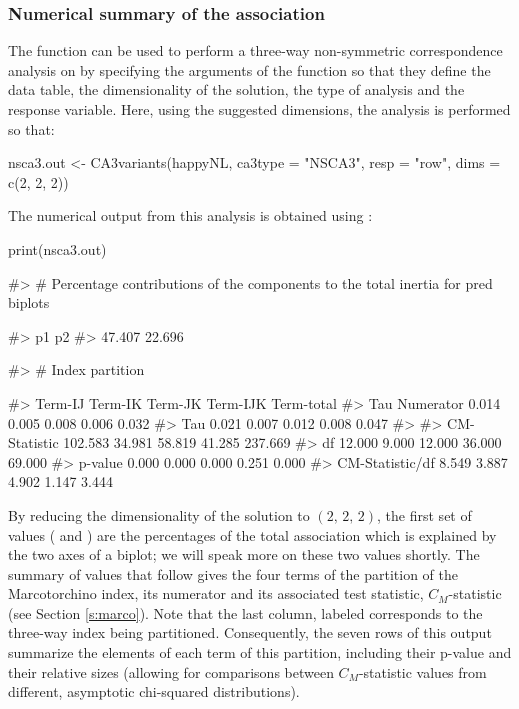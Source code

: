 \subsubsection{Numerical summary of the association}
The  function can be used to perform a three-way non-symmetric correspondence analysis on  by specifying the arguments of the function so that they define the data table, the dimensionality of the solution, the type of analysis and the response variable. Here, using the suggested dimensions, the analysis is performed so that: 
\begin{example}
 nsca3.out <- CA3variants(happyNL, ca3type = "NSCA3", resp = "row", 
 dims = c(2, 2, 2))
\end{example}
The numerical output from this analysis is obtained using : 
\begin{example}
 print(nsca3.out)

#> # Percentage contributions of the components to the total inertia for pred biplots

#>   p1     p2 
#> 47.407 22.696 

#> #  Index partition

#>                Term-IJ Term-IK Term-JK Term-IJK Term-total
#> Tau Numerator     0.014   0.005   0.008    0.006      0.032
#> Tau               0.021   0.007   0.012    0.008      0.047
#> %
#> CM-Statistic    102.583  34.981  58.819   41.285    237.669
#> df               12.000   9.000  12.000   36.000     69.000
#> p-value           0.000   0.000   0.000    0.251      0.000
#> CM-Statistic/df   8.549   3.887   4.902    1.147      3.444
\end{example}

By reducing the dimensionality of the solution to $\left(2, \, 2, \, 2\right)$, the first set of values ( and ) are the percentages of the total association which is explained by the two axes of a biplot; we will speak more on these two values shortly. The summary of values that follow  gives the four terms of the partition of the Marcotorchino index, its numerator and its associated test statistic, $C_M$-statistic (see Section \ref{s:marco}). Note that the last column, labeled  corresponds to the three-way index  being partitioned. Consequently, the seven rows of this output summarize the elements of each term of this partition, including their p-value and their relative sizes (allowing for comparisons between $C_M$-statistic values from different, asymptotic chi-squared distributions).  

